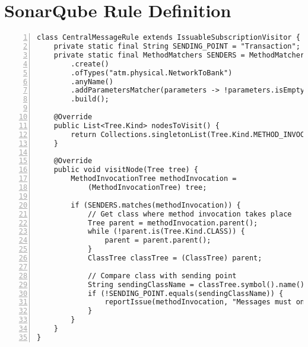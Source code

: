 \chapter{SonarQube Rule Definition}
\label{apx:sonarqube}

\begin{lstlisting}[caption={SonarQube custom rule that enforces constraint 3.}, captionpos=b, label=lst:sonarqube_rule, numbers=left, showstringspaces=false]
class CentralMessageRule extends IssuableSubscriptionVisitor {
    private static final String SENDING_POINT = "Transaction";
    private static final MethodMatchers SENDERS = MethodMatchers
        .create()
        .ofTypes("atm.physical.NetworkToBank")
        .anyName()
        .addParametersMatcher(parameters -> !parameters.isEmpty())
        .build();

    @Override
    public List<Tree.Kind> nodesToVisit() {
        return Collections.singletonList(Tree.Kind.METHOD_INVOCATION);
    }

    @Override
    public void visitNode(Tree tree) {
        MethodInvocationTree methodInvocation =
            (MethodInvocationTree) tree;

        if (SENDERS.matches(methodInvocation)) {
            // Get class where method invocation takes place
            Tree parent = methodInvocation.parent();
            while (!parent.is(Tree.Kind.CLASS)) {
                parent = parent.parent();
            }
            ClassTree classTree = (ClassTree) parent;

            // Compare class with sending point
            String sendingClassName = classTree.symbol().name();
            if (!SENDING_POINT.equals(sendingClassName)) {
                reportIssue(methodInvocation, "Messages must only be sent from the sending point");
            }
        }
    }
}
\end{lstlisting}
